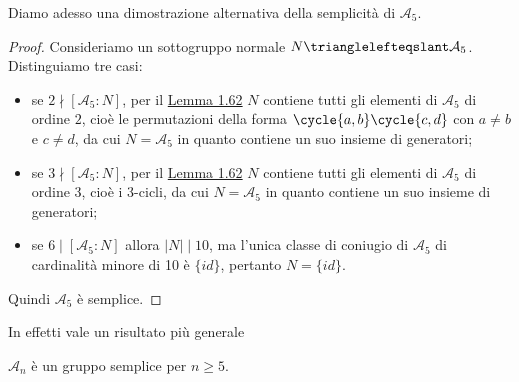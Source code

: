 \documentclass[11pt]{scrartcl}
\begin{document}
	Diamo adesso una dimostrazione alternativa della semplicità di $\mathcal{A}_5$.
	
	\begin{proof}
		Consideriamo un sottogruppo normale $N\trianglelefteqslant \mathcal{A}_5$.
		Distinguiamo tre casi:
		\begin{itemize}
			\item se $2 \nmid [\mathcal{A}_5:N]$, per il \hyperref[lemma1.62]{Lemma 1.62}
			$N$ contiene tutti gli elementi di 
			$\mathcal{A}_5$ di ordine $2$, cioè le permutazioni della forma $\cycle{a, b}\cycle{c, d}$
			con $a\neq b$ e $c \neq d$, da cui $N = \mathcal{A}_5$ in quanto contiene 
			un suo insieme di generatori;
			\item se $3\nmid [\mathcal{A}_5:N]$, per il \hyperref[lemma1.62]{Lemma 1.62}
			$N$ contiene tutti gli elementi di 
			$\mathcal{A}_5$ di ordine 3, cioè i 3-cicli, da cui $N = \mathcal{A}_5$
			in quanto contiene un suo insieme di generatori;
			\item se $6 \mid [\mathcal{A}_5:N]$ allora $|N| \mid 10$, ma l'unica
			classe di coniugio di $\mathcal{A}_5$ di cardinalità minore di 10 è
			$\{id\}$, pertanto $N = \{id\}$.
		\end{itemize}
		Quindi $\mathcal{A}_5$ è semplice.
	\end{proof}
	
	In effetti vale un risultato più generale
	
	\begin{proposition}
		$\mathcal{A}_n$ è un gruppo semplice per $n \geq 5$.
	\end{proposition}
	
\end{document}

